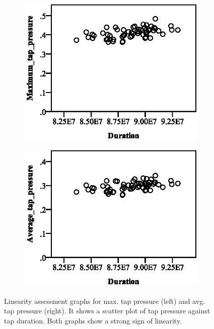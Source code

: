 \begin{figure}[ht]
\centering
\begin{subfigure}[b]{0.45\textwidth}
    \centering
    \includegraphics[width=\textwidth]{images/secondary/max/MaxLinearity.eps}
    \label{fig:sec_max_lin}
\end{subfigure}
\quad
\begin{subfigure}[b]{0.45\textwidth}
    \centering
    \includegraphics[width=\textwidth]{images/secondary/avg/AvgLinearity.eps}
    \label{fig:sec_avg_lin}
\end{subfigure}
\caption{Linearity assessment graphs for max. tap pressure (left) and avg. tap pressure (right). It shows a scatter plot of tap pressure against tap duration. Both graphs show a strong sign of linearity.}
\end{figure}